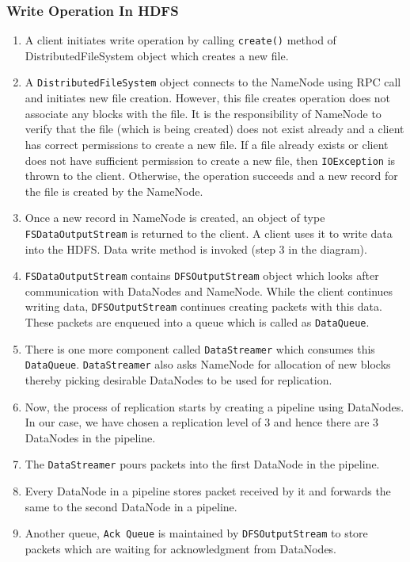 \documentclass{article}
\begin{document}
\subsubsection{Write Operation In HDFS}
\begin{enumerate}
    \item A client initiates write operation by calling \verb|create()| method of DistributedFileSystem object which creates a new file.
    \item A \texttt{DistributedFileSystem} object connects to the NameNode using RPC call and initiates new file creation. However, this file creates operation does not associate any blocks with the file. It is the responsibility of NameNode to verify that the file (which is being created) does not exist already and a client has correct permissions to create a new file. If a file already exists or client does not have sufficient permission to create a new file, then \texttt{IOException} is thrown to the client. Otherwise, the operation succeeds and a new record for the file is created by the NameNode.
    \item Once a new record in NameNode is created, an object of type \texttt{FSDataOutputStream} is returned to the client. A client uses it to write data into the HDFS. Data write method is invoked (step 3 in the diagram).
    \item \texttt{FSDataOutputStream} contains \texttt{DFSOutputStream} object which looks after communication with DataNodes and NameNode. While the client continues writing data, \texttt{DFSOutputStream} continues creating packets with this data. These packets are enqueued into a queue which is called as \texttt{DataQueue}.
    \item There is one more component called \texttt{DataStreamer} which consumes this \texttt{DataQueue}. \texttt{DataStreamer} also asks NameNode for allocation of new blocks thereby picking desirable DataNodes to be used for replication.
    \item Now, the process of replication starts by creating a pipeline using DataNodes. In our case, we have chosen a replication level of 3 and hence there are 3 DataNodes in the pipeline.
    \item The \texttt{DataStreamer} pours packets into the first DataNode in the pipeline.
    \item Every DataNode in a pipeline stores packet received by it and forwards the same to the second DataNode in a pipeline.
    \item Another queue, \texttt{Ack Queue} is maintained by \texttt{DFSOutputStream} to store packets which are waiting for acknowledgment from DataNodes.

\end{enumerate}
\end{document}

